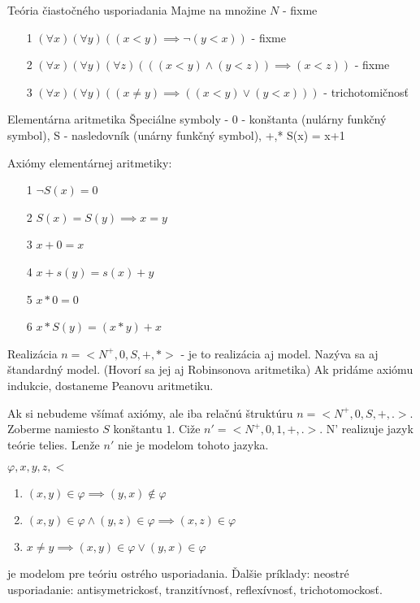 \begin{priklad}{Teória čiastočného usporiadania}
    Majme  na množine $N$ - fixme
    \begin{itemize}
    \item[1] $(\forall x)(\forall y) ((x < y) \implies \neg (y < x))$ - fixme
    \item[2] $(\forall x)(\forall y)(\forall z) (((x<y) \land (y<z)) \implies
        (x<z))$ - fixme
    \item[3] $(\forall x)(\forall y)( (x\not=y) \implies ((x<y) \lor (y<x)))$ -
     trichotomičnosť
    \end{itemize}
\end{priklad}

\begin{priklad}{Elementárna aritmetika}
Špeciálne symboly - 0 - konštanta (nulárny funkčný symbol),
    S - nasledovník (unárny funkčný symbol),
    +,*
    S(x) = x+1

Axiómy elementárnej aritmetiky:
\begin{itemize}
    \item[1] $\neg S(x) = 0$
    \item[2] $S(x) = S(y) \implies x=y$
    \item[3] $x+0 = x$
    \item[4] $x+s(y) = s(x) + y$
    \item[5] $x * 0 = 0$
    \item[6] $x * S(y) = (x*y)+x$
\end{itemize}
Realizácia
$n=<N^+,0,S,+,*>$ - je to realizácia aj model. Nazýva sa aj štandardný
model. (Hovorí sa jej aj Robinsonova aritmetika)
Ak pridáme axiómu indukcie, dostaneme Peanovu aritmetiku.
\end{priklad}

\begin{poznamka}
    Ak si nebudeme všímať axiómy, ale iba relačnú štruktúru
    $n=<N^+,0,S,+,.>$. Zoberme namiesto $S$ konštantu $1$.
    Ciže $n'=<N^+,0,1,+,.>$. N' realizuje jazyk teórie telies.
    Lenže $n'$ nie je modelom tohoto jazyka. 
\end{poznamka}

\begin{priklad}[Usporiadania]
    $\varphi, x, y, z, <$
    \begin{enumerate}
        \item $(x,y) \in \varphi  \implies (y,x) \notin  \varphi$
        \item $(x,y) \in \varphi \land (y,z) \in \varphi \implies (x,z) \in \varphi$
        \item $x \neq y \implies (x,y) \in \varphi \lor (y,x) \in \varphi$
    \end{enumerate}

je modelom pre teóriu ostrého usporiadania.
Ďalšie príklady: neostré usporiadanie: antisymetrickosť, tranzitívnosť,
reflexívnosť, trichotomockosť.
\end{priklad}


